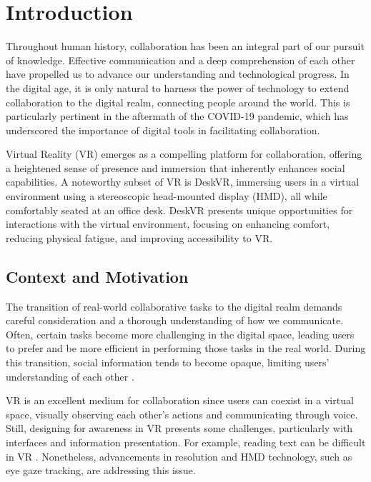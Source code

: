 \chapter{Introduction} \label{chap:intro}

Throughout human history, collaboration has been an integral part of our pursuit of knowledge. Effective communication and a deep comprehension of each other have propelled us to advance our understanding and technological progress. In the digital age, it is only natural to harness the power of technology to extend collaboration to the digital realm, connecting people around the world. This is particularly pertinent in the aftermath of the COVID-19 pandemic, which has underscored the importance of digital tools in facilitating collaboration.

Virtual Reality (VR) emerges as a compelling platform for collaboration, offering a heightened sense of presence and immersion that inherently enhances social capabilities. A noteworthy subset of VR is DeskVR, immersing users in a virtual environment using a stereoscopic head-mounted display (HMD), all while comfortably seated at an office desk. DeskVR presents unique opportunities for interactions with the virtual environment, focusing on enhancing comfort, reducing physical fatigue, and improving accessibility to VR.

\section{Context and Motivation}

The transition of real-world collaborative tasks to the digital realm demands careful consideration and a thorough understanding of how we communicate. Often, certain tasks become more challenging in the digital space, leading users to prefer and be more efficient in performing those tasks in the real world. During this transition, social information tends to become opaque, limiting users' understanding of each other \cite{ericksonSocialTranslucenceApproach2000}.

VR is an excellent medium for collaboration since users can coexist in a virtual space, visually observing each other's actions and communicating through voice. Still, designing for awareness in VR presents some challenges, particularly with interfaces and information presentation. For example, reading text can be difficult in VR \cite{rauSpeedReadingVirtual2018, kimUserDiscomfortUsing2021}. Nonetheless, advancements in resolution and HMD technology, such as eye gaze tracking, are addressing this issue.

